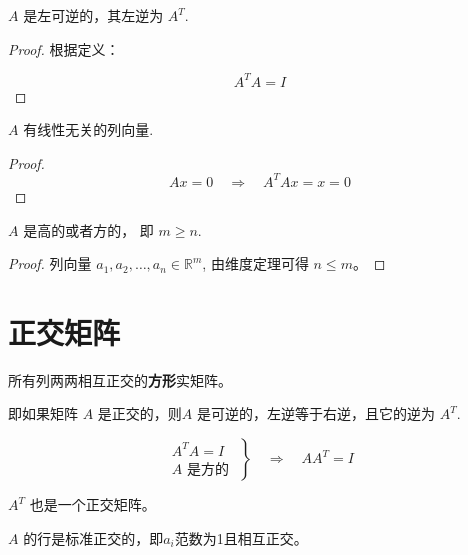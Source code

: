\begin{theorem}
    $ A $ 是左可逆的，其左逆为 $ A^{T} $.
\end{theorem}

\begin{proof}
    根据定义：

$$
A^{T} A=I
$$
\end{proof}

\begin{theorem}
    $ A $ 有线性无关的列向量.
\end{theorem}

\begin{proof}
    $$
A x=0 \quad \Rightarrow \quad A^{T} A x=x=0
$$
\end{proof}

\begin{theorem}
    $A$ 是高的或者方的， 即 $m \geq n$.
\end{theorem}

\begin{proof}
    列向量 $ a_{1}, a_{2}, \ldots, a_{n} \in \mathbb{R}^{m} $, 由维度定理可得 $ n \leq m $。
\end{proof}

\section{正交矩阵}

\begin{definition}[正交矩阵]
    所有列两两相互正交的\textbf{方形}实矩阵。
\end{definition}

\begin{theorem}[正交矩阵满足非奇异性]
    
    即如果矩阵 $ A $ 是正交的，则$ A $ 是可逆的，左逆等于右逆，且它的逆为 $ A^{T} $.

    $$ \left.\begin{array}{l}A^{T} A=I \\ A \text { 是方的 }\end{array}\right\} \quad \Rightarrow \quad A A^{T}=I $$
\end{theorem}

\begin{corollary}
    $ A^{T} $ 也是一个正交矩阵。
\end{corollary}

\begin{corollary}
    $ A $ 的行是标准正交的，即$a_i$范数为1且相互正交。
\end{corollary}

